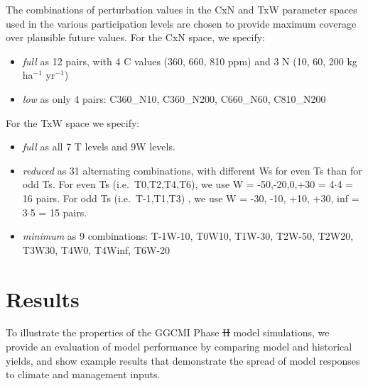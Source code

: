 \documentclass[gmd, manuscript]{copernicus} %
\providecommand{\DIFadd}[1]{{\protect\color{blue}\uwave{#1}}} %
\providecommand{\DIFdel}[1]{{\protect\color{red}\sout{#1}}}                      %
\providecommand{\DIFaddbegin}{} %
\providecommand{\DIFaddend}{} %
\providecommand{\DIFdelbegin}{} %
\providecommand{\DIFdelend}{} %
\begin{document}
The combinations of perturbation values in the CxN and TxW parameter spaces used in the various participation levels are chosen to provide maximum coverage over plausible future values. For the CxN space, we specify:
\begin{itemize}
  \item \textit{full} as 12 pairs, with 4 C values (360, \DIFaddbegin \DIFadd{510, }\DIFaddend 660, 810 ppm) and 3 N (10, 60, 200 kg ha$^{-1}$ yr$^{-1}$)
  \item \textit{low} as only 4 pairs: C360\_N10, C360\_N200, C660\_N60, C810\_N200
\end{itemize}

For the TxW space we specify:
\begin{itemize}
  \item \textit{full} as all 7 T levels and 9W levels.
  \item \textit{reduced} as 31 alternating combinations, with different Ws for even Ts than for odd Ts. For even Ts (i.e.\ T0,T2,T4,T6), we use W = -50,-20,0,+30 = 4$\cdot$4 = 16 pairs. For odd Ts (i.e.\ T-1,T1,T3) , we use W = -30, -10, +10, +30, inf = 3$\cdot$5 = 15 pairs.
  \item \textit{minimum} as 9 combinations: T-1W-10, T0W10, T1W-30, T2W-50, T2W20, T3W30, T4W0, T4Winf, T6W-20
\end{itemize}


\section{Results}
\label{S:4}

To illustrate the properties of the GGCMI Phase \DIFdelbegin \DIFdel{II }\DIFdelend \DIFaddbegin \DIFadd{2 }\DIFaddend model simulations, we provide an evaluation of model performance by comparing model and historical yields, and show example results that demonstrate the spread of model responses to climate and management inputs. 
\end{document}
